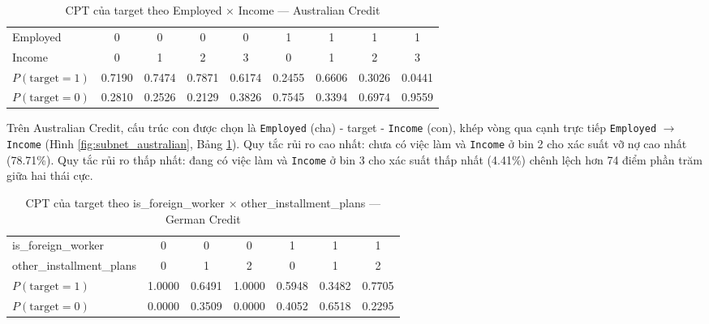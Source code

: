 \FloatBarrier
\begin{table}[htbp]
\centering
\caption{CPT của target theo Employed × Income --- Australian Credit}
\label{tab:cpt_australian}
\begin{tabular}{lcccccccc}
\toprule
Employed & 0 & 0 & 0 & 0 & 1 & 1 & 1 & 1 \\
Income   & 0 & 1 & 2 & 3 & 0 & 1 & 2 & 3 \\
\midrule
$P(\text{target}=1)$ & 0.7190 & 0.7474 & 0.7871 & 0.6174 & 0.2455 & 0.6606 & 0.3026 & 0.0441 \\
$P(\text{target}=0)$ & 0.2810 & 0.2526 & 0.2129 & 0.3826 & 0.7545 & 0.3394 & 0.6974 & 0.9559 \\
\bottomrule
\end{tabular}
\end{table}
\FloatBarrier

Trên Australian Credit, cấu trúc con được chọn là \texttt{Employed} (cha) - target - \texttt{Income} (con), khép vòng qua cạnh trực tiếp \texttt{Employed} $\rightarrow$ \texttt{Income} (Hình \ref{fig:subnet_australian}, Bảng \ref{tab:cpt_australian}). Quy tắc rủi ro cao nhất: chưa có việc làm và \texttt{Income} ở bin 2 cho xác suất vỡ nợ cao nhất (78.71\%). Quy tắc rủi ro thấp nhất: đang có việc làm và \texttt{Income} ở bin 3 cho xác suất thấp nhất (4.41\%) chênh lệch hơn 74 điểm phần trăm giữa hai thái cực.

\vspace{1em}
\begin{table}[htbp]
\centering
\caption{CPT của target theo is\_foreign\_worker × other\_installment\_plans --- German Credit}
\label{tab:cpt_german}
\begin{tabular}{lcccccc}
\toprule
is\_foreign\_worker & 0 & 0 & 0 & 1 & 1 & 1 \\
other\_installment\_plans & 0 & 1 & 2 & 0 & 1 & 2 \\
\midrule
$P(\text{target}=1)$ & 1.0000 & 0.6491 & 1.0000 & 0.5948 & 0.3482 & 0.7705 \\
$P(\text{target}=0)$ & 0.0000 & 0.3509 & 0.0000 & 0.4052 & 0.6518 & 0.2295 \\
\bottomrule
\end{tabular}
\end{table}


